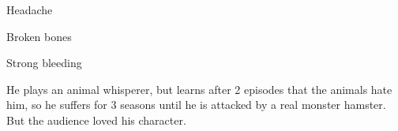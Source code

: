 \begin{npcBox}[title=Theophil Tierlieb]

    \begin{aspects}
    \item {}
    \item {}
    \item {}
    \end{aspects}

    \begin{skills}
    \item {}
    \item {}
    \item {}
    \item {}
    \item {}
    \item {}
    \item {}
    \item {}
    \item {}
    \item {}
    \item {}
    \item {}
    \item {}
    \item {}
    \item {}
    \item {}
    \item {}
    \item {}
    \item {}
    \end{skills}

    \begin{stressSection}
    \end{stressSection}
    \begin{tabularx}{\textwidth}{ XX }
    \end{tabularx}

    \begin{consequences}
    \item {} Headache
    \item {} Broken bones
    \item {} Strong bleeding
    \end{consequences}

    \begin{npcDescription}
    He plays an animal whisperer, but learns after 2 episodes that the animals hate him, so he suffers for 3 seasons until he is attacked by a real monster hamster. But the audience loved his character.
    \end{npcDescription}

\end{npcBox}


